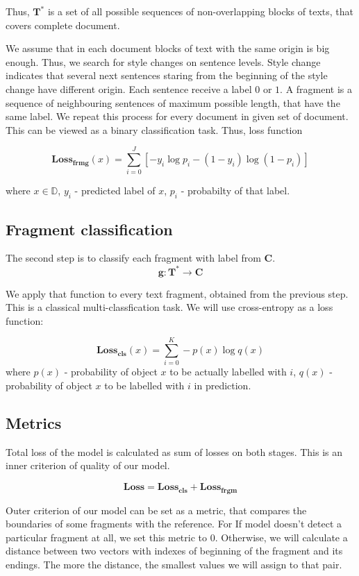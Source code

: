 \documentclass{article}
\begin{document}
Thus, $\mathbf{T}^*$ is a set of all possible sequences of non-overlapping blocks of texts, that covers complete document.

We assume that in each document blocks of text with the same origin is big enough. Thus, we search for style changes on sentence levels. Style change indicates that several next sentences staring from the beginning of the style change have different origin. Each sentence receive a label $0$ or $1$. A fragment is a sequence of neighbouring sentences of maximum possible length, that have the same label. We repeat this process for every document in given  set of document. This can be viewed as a binary classification task. Thus, loss function

$$\mathbf{Loss_{frmg}}(x) = \sum_{i=0}^J [-y_i \log p_i - (1 - y_i) \log (1 - p_i)] $$

where $x \in \mathbb{D}$, $y_i$ - predicted label of $x$, $p_i$ - probabilty of that label.


\subsection{Fragment classification}

The second step is to classify each fragment with label from $\mathbf{C}$.
$$\mathbf{g}: \mathbf{T}^* \rightarrow \mathbf{C}$$

We apply that function to every text fragment, obtained from the previous step. This is a classical multi-classfication task. We will use cross-entropy as a loss function:

$$\mathbf{Loss_{cls}}(x) = \sum_{i=0}^K-p(x)\log q(x)$$ 
where $p(x)$ - probability of object $x$ to be actually labelled with $i$,
$q(x)$ -  probability of object $x$ to be labelled with $i$  in prediction.

\subsection{Metrics}
Total loss of the model is calculated as sum of losses on both stages. This is an inner criterion of quality of our model.

$$\mathbf{Loss} = \mathbf{Loss_{cls}} + \mathbf{Loss_{frgm}}$$

Outer criterion of our model can be set as a metric, that compares the boundaries of some fragments with the reference. For If model doesn't detect a particular fragment at all, we set this metric to 0. Otherwise, we will calculate a distance between two vectors with indexes of beginning of the fragment and its endings.
The more the distance, the smallest values we will assign to that pair. 
\end{document}
